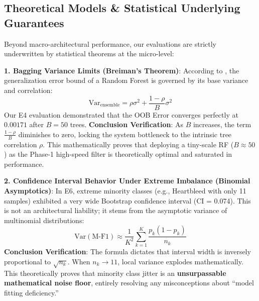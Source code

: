 \documentclass[sigconf]{acmart}
\begin{document}
\subsection{Theoretical Models \& Statistical Underlying Guarantees}

Beyond macro-architectural performance, our evaluations are strictly underwritten by statistical theorems at the micro-level:

\textbf{1. Bagging Variance Limits (Breiman's Theorem)}: According to \cite{3}, the generalization error bound of a Random Forest is governed by its base variance and correlation:
$$ \text{Var}_{\text{ensemble}} = \rho\sigma^2 + \frac{1-\rho}{B}\sigma^2 $$
Our E4 evaluation demonstrated that the OOB Error converges perfectly at $0.00171$ after $B=50$ trees. \textbf{Conclusion Verification}: As $B$ increases, the term $\frac{1-\rho}{B}$ diminishes to zero, locking the system bottleneck to the intrinsic tree correlation $\rho$. This mathematically proves that deploying a tiny-scale RF ($B \approx 50$) as the Phase-1 high-speed filter is theoretically optimal and saturated in performance.

\textbf{2. Confidence Interval Behavior Under Extreme Imbalance (Binomial Asymptotics)}: In E6, extreme minority classes (e.g., Heartbleed with only 11 samples) exhibited a very wide Bootstrap confidence interval (CI = 0.074). This is not an architectural liability; it stems from the asymptotic variance of multinomial distributions:
$$ \text{Var}(\text{M-F1}) \approx \frac{1}{K^2} \sum_{k=1}^K \frac{p_k(1-p_k)}{n_k} $$
\textbf{Conclusion Verification}: The formula dictates that interval width is inversely proportional to $\sqrt{n_k}$. When $n_k \to 11$, local variance explodes mathematically. This theoretically proves that minority class jitter is an \textbf{unsurpassable mathematical noise floor}, entirely resolving any misconceptions about ``model fitting deficiency.''
\end{document}
